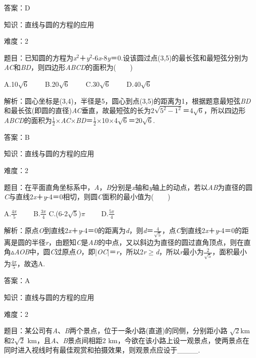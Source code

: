 \documentclass{article} %
\begin{document}
答案：D

知识：直线与圆的方程的应用

难度：2

题目：已知圆的方程为\textit{x}${}^{2}$＋\textit{y}${}^{2}$-6\textit{x}-8\textit{y}＝0.设该圆过点(3,5)的最长弦和最短弦分别为\textit{AC}和\textit{BD}，则四边形\textit{ABCD}的面积为(　　)

A.10$\sqrt{6}$　　 B.20$\sqrt{6}$　　 C.30$\sqrt{6}$　　 D.40$\sqrt{6}$

解析：圆心坐标是(3,4)，半径是5，圆心到点(3,5)的距离为1，根据题意最短弦\textit{BD}和最长弦(即圆的直径)\textit{AC}垂直，故最短弦的长为2$\sqrt{5^2-1^2}$＝4$\sqrt{6}$，所以四边形\textit{ABCD}的面积为$\frac{1}{2}\mathrm{\times}$\textit{AC}$\mathrm{\times}$\textit{BD}＝$\frac{1}{2}\mathrm{\times}$10$\mathrm{\times}$4$\sqrt{6}$＝20$\sqrt{6}$.

答案：B

知识：直线与圆的方程的应用

难度：2

题目：在平面直角坐标系中，\textit{A}，\textit{B}分别是\textit{x}轴和\textit{y}轴上的动点，若以\textit{AB}为直径的圆\textit{C}与直线2\textit{x}＋\textit{y}-4＝0相切，则圆\textit{C}面积的最小值为(　　)

A.$\frac{4\pi}{5}$　　 B.$\frac{3\pi}{4}$  C.(6-2$\sqrt{5}$)$\pi$　　 D.$\frac{5\pi}{4}$

解析：原点\textit{O}到直线2\textit{x}＋\textit{y}-4＝0的距离为\textit{d}，则\textit{d}＝$\frac{4}{\sqrt{5}}$，点\textit{C}到直线2\textit{x}＋\textit{y}-4＝0的距离是圆的半径\textit{r}，由题知\textit{C}是\textit{AB}的中点，又以斜边为直径的圆过直角顶点，则在直角$\mathrm{\vartriangle}$\textit{AOB}中，圆\textit{C}过原点\textit{O}，即|\textit{OC}|＝\textit{r}，所以2\textit{r}$\mathrm{\ge}$\textit{d}，所以\textit{r}最小为$\frac{2}{\sqrt{5}}$，面积最小为$\frac{4\pi}{5}$，故选A.

答案：A


知识：直线与圆的方程的应用

难度：2

题目：某公司有\textit{A}、\textit{B}两个景点，位于一条小路(直道)的同侧，分别距小路 $\sqrt{2}$km和2$\sqrt{2}$ km，且\textit{A}、\textit{B}景点间相距2 km，今欲在该小路上设一观景点，使两景点在同时进入视线时有最佳观赏和拍摄效果，则观景点应设于\_\_\_\_.
\end{document}
